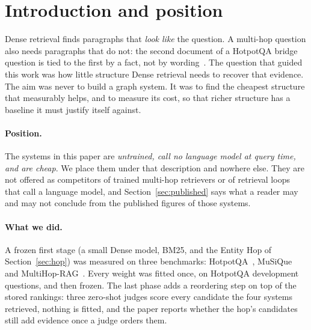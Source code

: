 \section{Introduction and position}
\label{sec:intro}

Dense retrieval finds paragraphs that \emph{look like} the question. A multi-hop question also
needs paragraphs that do not: the second document of a HotpotQA bridge question is tied to the
first by a fact, not by wording~\citep{yang2018hotpotqa}. The question that guided this work
was how little structure Dense retrieval needs to recover that evidence. The aim was never to
build a graph system. It was to find the cheapest structure that measurably helps, and to
measure its cost, so that richer structure has a baseline it must justify itself against.

\paragraph{Position.} The systems in this paper are \emph{untrained, call no language model at
query time, and are cheap}. We place them under that description and nowhere else. They are not
offered as competitors of trained multi-hop retrievers or of retrieval loops that call a language
model, and Section~\ref{sec:published} says what a reader may and may not conclude from the
published figures of those systems.

\paragraph{What we did.} A frozen first stage (a small Dense model, BM25, and the Entity Hop of
Section~\ref{sec:hop}) was measured on three benchmarks: HotpotQA~\citep{yang2018hotpotqa},
MuSiQue~\citep{trivedi2022musique} and MultiHop-RAG~\citep{tang2024multihoprag}. Every weight
was fitted once, on HotpotQA development questions, and then frozen. The last phase adds a
reordering step on top of the stored rankings: three zero-shot judges score every candidate the
four systems retrieved, nothing is fitted, and the paper reports whether the hop's candidates
still add evidence once a judge orders them.

